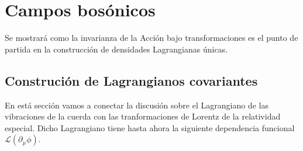 \chapter{Campos bosónicos}
\label{cha:campos-vectoriales} %

 Se mostrará como la invarianza de la Acción bajo transformaciones es el punto de partida en la construcción de densidades Lagrangianas únicas.




 

\section{Construción de Lagrangianos covariantes}
En está sección vamos a conectar la discusión sobre el Lagrangiano de las vibraciones de la cuerda con las tranformaciones de Lorentz de la relatividad especial. Dicho Lagrangiano tiene hasta ahora la siguiente dependencia funcional $\mathcal{L}(\partial_{\mu}\phi)$.

